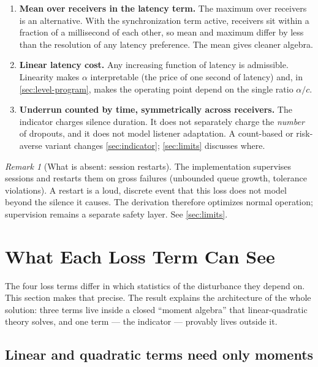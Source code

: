 \documentclass[11pt, a4paper]{article}
\theoremstyle{definition}
\theoremstyle{plain}
\theoremstyle{remark}
\newtheorem{remark}{Remark}[section]
\begin{document}
\begin{enumerate}[label=(\alph*)]
  \item \textbf{Mean over receivers in the latency term.}  The maximum
    over receivers is an alternative.  With the synchronization term
    active, receivers sit within a fraction of a millisecond of each
    other, so mean and maximum differ by less than the resolution of any
    latency preference.  The mean gives cleaner algebra.
  \item \textbf{Linear latency cost.}  Any increasing function of
    latency is admissible.  Linearity makes $\alpha$ interpretable (the
    price of one second of latency) and, in \cref{sec:level-program},
    makes the operating point depend on the single ratio $\alpha/c$.
  \item \textbf{Underrun counted by time, symmetrically across
    receivers.}  The indicator charges silence duration.  It does not
    separately charge the \emph{number} of dropouts, and it does not
    model listener adaptation.  A count-based or risk-averse variant
    changes \cref{sec:indicator}; \cref{sec:limits} discusses where.
\end{enumerate}

\begin{remark}[What is absent: session restarts]\label{rem:no-restart}
The implementation supervises sessions and restarts them on gross
failures (unbounded queue growth, tolerance violations).  A restart is a
loud, discrete event that this loss does not model beyond the silence it
causes.  The derivation therefore optimizes normal operation; supervision
remains a separate safety layer.  See \cref{sec:limits}.
\end{remark}

\section{What Each Loss Term Can See}\label{sec:sufficiency}

The four loss terms differ in which statistics of the disturbance they
depend on.  This section makes that precise.  The result explains the
architecture of the whole solution: three terms live inside a closed
``moment algebra'' that linear-quadratic theory solves, and one term ---
the indicator --- provably lives outside it.

\subsection{Linear and quadratic terms need only moments}
\label{sec:moments-suffice}
\end{document}
